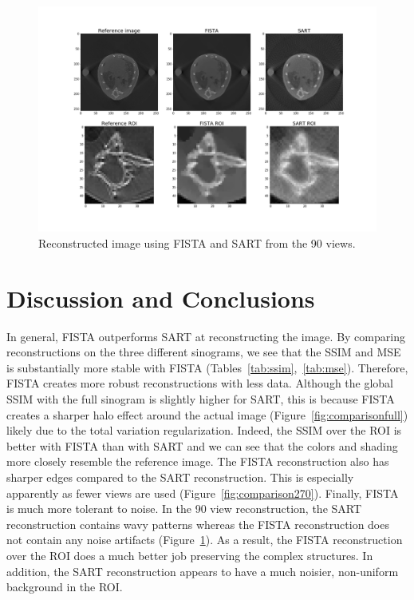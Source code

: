 \documentclass[12pt]{article}
\begin{document}
\begin{figure}[H]
	\centering
	\includegraphics[height=0.35\paperheight]{../results/comparison90.png}
	\caption{Reconstructed image using FISTA and SART from the 90 views.}
	\label{fig:comparison90}
\end{figure}

\section{Discussion and Conclusions}
In general, FISTA outperforms SART at reconstructing the image. By comparing reconstructions on the three different sinograms, we see that the SSIM and MSE is substantially more stable with FISTA (Tables~\ref{tab:ssim},~\ref{tab:mse}). Therefore, FISTA creates more robust reconstructions with less data. Although the global SSIM with the full sinogram is slightly higher for SART, this is because FISTA creates a sharper halo effect around the actual image (Figure~\ref{fig:comparisonfull}) likely due to the total variation regularization. Indeed, the SSIM over the ROI is better with FISTA than with SART and we can see that the colors and shading more closely resemble the reference image. The FISTA reconstruction also has sharper edges compared to the SART reconstruction. This is especially apparently as fewer views are used (Figure~\ref{fig:comparison270}). Finally, FISTA is much more tolerant to noise. In the 90 view reconstruction, the SART reconstruction contains wavy patterns whereas the FISTA reconstruction does not contain any noise artifacts (Figure~\ref{fig:comparison90}). As a result, the FISTA reconstruction over the ROI does a much better job preserving the complex structures. In addition, the SART reconstruction appears to have a much noisier, non-uniform background in the ROI.
\end{document}
